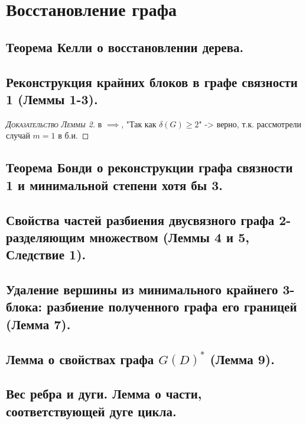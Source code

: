 \newpage

\section{Восстановление графа}

\subsection{Теорема Келли о восстановлении дерева.}

\subsection{Реконструкция крайних блоков в графе связности 1 (Леммы 1-3).}

\begin{proof}[\normalfont\textsc{Доказательство Леммы 2}]
	в $\implies$, "Так как $\delta(G) \geq 2$" -> верно, т.к. рассмотрели случай $m = 1$ в б.и.
\end{proof}

\subsection{Теорема Бонди о реконструкции графа связности 1 и минимальной степени хотя бы 3.}

\subsection{Свойства частей разбиения двусвязного графа 2-разделяющим множеством (Леммы 4 и 5, Следствие 1).}

\subsection{Удаление вершины из минимального крайнего 3-блока: разбиение полученного графа его границей (Лемма 7).}

\subsection{Лемма о свойствах графа $G(D)^*$ (Лемма 9).}

\subsection{Вес ребра и дуги. Лемма о части, соответствующей дуге цикла.}


